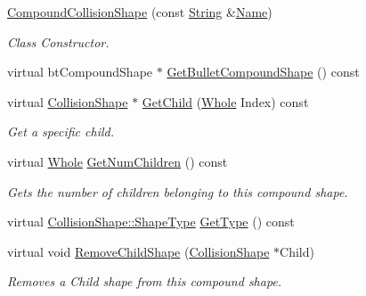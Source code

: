 \begin{DoxyCompactItemize}
\hyperlink{classMezzanine_1_1CompoundCollisionShape_ad8cdd209d948e98b629378db81a77181}{CompoundCollisionShape} (const \hyperlink{namespaceMezzanine_acf9fcc130e6ebf08e3d8491aebcf1c86}{String} \&\hyperlink{classMezzanine_1_1CollisionShape_aac524c5c56fa4d158bc071f8aecfbe79}{Name})
\begin{DoxyCompactList}\small\item\em Class Constructor. \item\end{DoxyCompactList}\item 
virtual btCompoundShape $\ast$ \hyperlink{classMezzanine_1_1CompoundCollisionShape_adcf3f393c1be71c3ffb50782c375ea57}{GetBulletCompoundShape} () const 
\item 
virtual \hyperlink{classMezzanine_1_1CollisionShape}{CollisionShape} $\ast$ \hyperlink{classMezzanine_1_1CompoundCollisionShape_a707e6da7fef980a55f9c6477f152d0a9}{GetChild} (\hyperlink{namespaceMezzanine_adcbb6ce6d1eb4379d109e51171e2e493}{Whole} Index) const 
\begin{DoxyCompactList}\small\item\em Get a specific child. \item\end{DoxyCompactList}\item 
virtual \hyperlink{namespaceMezzanine_adcbb6ce6d1eb4379d109e51171e2e493}{Whole} \hyperlink{classMezzanine_1_1CompoundCollisionShape_ae21437b0ba98b553a1f651e7eb9f6542}{GetNumChildren} () const 
\begin{DoxyCompactList}\small\item\em Gets the number of children belonging to this compound shape. \item\end{DoxyCompactList}\item 
virtual \hyperlink{classMezzanine_1_1CollisionShape_ad04186055565998879b64176d6dd100d}{CollisionShape::ShapeType} \hyperlink{classMezzanine_1_1CompoundCollisionShape_a8b701bbbc32b007f32884946d285fba1}{GetType} () const 
\item 
virtual void \hyperlink{classMezzanine_1_1CompoundCollisionShape_a4c0e2d16e20b37c4c8fcd96d7229dc1f}{RemoveChildShape} (\hyperlink{classMezzanine_1_1CollisionShape}{CollisionShape} $\ast$Child)
\begin{DoxyCompactList}\small\item\em Removes a Child shape from this compound shape. \item\end{DoxyCompactList}\item 

\end{DoxyCompactItemize}
